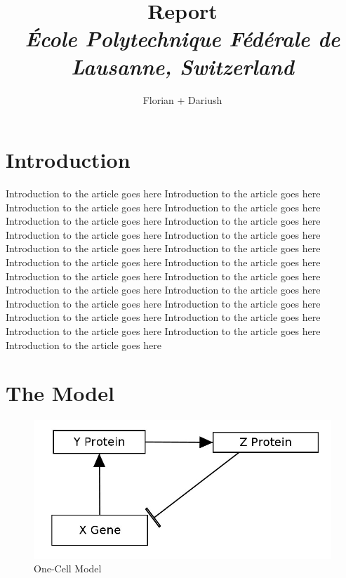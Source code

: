 \documentclass[10pt,a4paper,oneside,twocolumn]{article}
\numberwithin{equation}{section} %
\begin{document}
\title{\huge{\textbf{Report}}\\
	\vspace{0.5cm}
	\Large{\textit{\'Ecole Polytechnique F\'ed\'erale de Lausanne, Switzerland}}}
\author{\large{Florian + Dariush}}

\begin{titlepage}
 \maketitle
\thispagestyle{empty}
\end{titlepage}

\section{Introduction}
    Introduction to the article goes here    Introduction to the article goes here  Introduction to the article goes here  Introduction to the article goes here  Introduction to the article goes here  Introduction to the article goes here  Introduction to the article goes here  Introduction to the article goes here  Introduction to the article goes here  Introduction to the article goes here  Introduction to the article goes here  Introduction to the article goes here  Introduction to the article goes here  Introduction to the article goes here  Introduction to the article goes here  Introduction to the article goes here  Introduction to the article goes here  Introduction to the article goes here  Introduction to the article goes here  Introduction to the article goes here  Introduction to the article goes here  Introduction to the article goes here Introduction to the article goes here \\

\section{The Model}

    \begin{figure}[!h]
	\centering
	\includegraphics[scale=0.3]{sketch.png}
	\caption{One-Cell Model\\
	}
    \end{figure}
    
\end{document}
